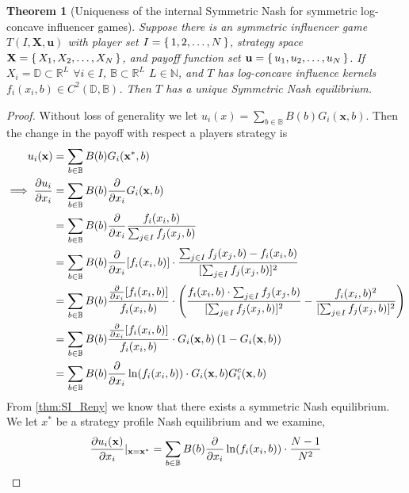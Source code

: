 \documentclass{article}
\newtheorem{theorem}{Theorem}[section]
\newcommand {\R}{\mathbb{R}}
\newcommand {\N}{\mathbb{N}}
\newcommand {\D}{\mathbb{D}}
\newcommand {\B}{\mathbb{B}}
\begin{document}
            \begin{theorem}[Uniqueness of the internal Symmetric Nash for symmetric log-concave influencer games]\label{thm:SI_uniqueness}
             Suppose there is an symmetric influencer game $T(I,\mathbf{X},\mathbf{u})$ with player set $I=\set{1,2,\dots, N}$, strategy space $\mathbf{X}=\set{X_1,X_2,\dots, X_N}$, and payoff function set $\mathbf{u}=\set{u_1,u_2,\dots, u_N}$. If  $X_i=\mathbb{D}\subset \R ^L$ $\forall i\in I$, $\mathbb{B}\subset \R^L$  $L\in \N$, and $T$ has log-concave influence kernels $f_i(x_i,b)\in C^2(\D,\B)$. Then $T$ has a unique Symmetric Nash equilibrium. 
             \end{theorem}
             \begin{proof}
                Without loss of generality we let $u_i(x)=\sum_{b\in\mathbb{B}} B(b)G_i(\mathbf{x},b)$. Then the change in the payoff with respect a players strategy is
                \begin{align}
                    u_i(\mathbf{x})&=\sum_{b\in\mathbb{B}} B(b)G_i(\mathbf{x}^*,b) \\ %
                    \implies \pdv{u_i}{x_i}&=\sum_{b\in\mathbb{B}} B(b)\pdv{}{x_i}G_i(\mathbf{x},b) \\ %
                    &=\sum_{b\in\mathbb{B}} B(b)\pdv{}{x_i}\frac{f_i(x_i,b)}{\sum_{j\in I}f_j(x_j,b)} \\ %
                    &=\sum_{b\in\mathbb{B}} B(b)\pdv{}{x_i}[f_i(x_i,b)]\cdot \frac{\sum_{j\in I}f_j(x_j,b)-f_i(x_i,b)}{[\sum_{j\in I}f_j(x_j,b)]^2} \\ %
                    &=\sum_{b\in\mathbb{B}} B(b)\frac{\pdv{}{x_i}[f_i(x_i,b)]}{f_i(x_i,b)}\cdot\left(\frac{f_i(x_i,b)\cdot \sum_{j\in I}f_j(x_j,b)}{[\sum_{j\in I}f_j(x_j,b)]^2}- \frac{f_i(x_i,b)^2}{[\sum_{j\in I}f_j(x_j,b)]^2}\right) \\ %
                    &=\sum_{b\in\mathbb{B}} B(b)\frac{\pdv{}{x_i}[f_i(x_i,b)]}{f_i(x_i,b)}\cdot G_i(\mathbf{x},b)\left(1- G_i(\mathbf{x},b)\right) \\ %
                    &=\sum_{b\in\mathbb{B}} B(b)\pdv{}{x_i}\ln(f_i(x_i,b)) \cdot G_i(\mathbf{x},b) G_i^c(\mathbf{x},b)\label{eq:SI_derivative_payoff}
                \end{align}
                 From \cref{thm:SI_Reny} we know that there exists a symmetric Nash equilibrium. We let $\mathbf{}{x}^*$ be a strategy profile Nash equilibrium and we examine, 
                 \begin{align}
                     \pdv{u_i(\mathbf{x})}{x_i}|_{\mathbf{x}=\mathbf{x^*}}&=\sum_{b\in\mathbb{B}} B(b)\pdv{}{x_i}\ln(f_i(x_i,b)) \cdot\frac{N-1}{N^2} \\ %

\end{align}
\end{proof}
\end{document}
